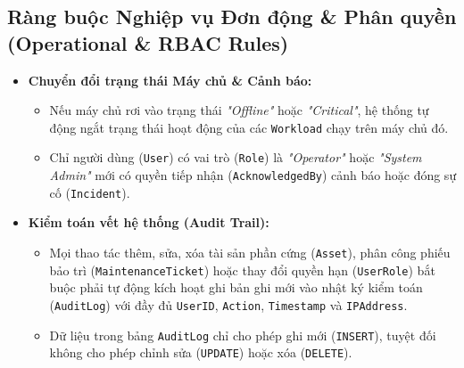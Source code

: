 \subsection{Ràng buộc Nghiệp vụ Đơn động \& Phân quyền (Operational \& RBAC Rules)}
\begin{itemize}[leftmargin=2em]
    \item \textbf{Chuyển đổi trạng thái Máy chủ \& Cảnh báo:}
    \begin{itemize}
        \item Nếu máy chủ rơi vào trạng thái \textit{"Offline"} hoặc \textit{"Critical"}, hệ thống tự động ngắt trạng thái hoạt động của các \texttt{Workload} chạy trên máy chủ đó.
        \item Chỉ người dùng (\texttt{User}) có vai trò (\texttt{Role}) là \textit{"Operator"} hoặc \textit{"System Admin"} mới có quyền tiếp nhận (\texttt{AcknowledgedBy}) cảnh báo hoặc đóng sự cố (\texttt{Incident}).
    \end{itemize}
    \item \textbf{Kiểm toán vết hệ thống (Audit Trail):}
    \begin{itemize}
        \item Mọi thao tác thêm, sửa, xóa tài sản phần cứng (\texttt{Asset}), phân công phiếu bảo trì (\texttt{MaintenanceTicket}) hoặc thay đổi quyền hạn (\texttt{UserRole}) bắt buộc phải tự động kích hoạt ghi bản ghi mới vào nhật ký kiểm toán (\texttt{AuditLog}) với đầy đủ \texttt{UserID}, \texttt{Action}, \texttt{Timestamp} và \texttt{IPAddress}.
        \item Dữ liệu trong bảng \texttt{AuditLog} chỉ cho phép ghi mới (\texttt{INSERT}), tuyệt đối không cho phép chỉnh sửa (\texttt{UPDATE}) hoặc xóa (\texttt{DELETE}).
    \end{itemize}
\end{itemize}
